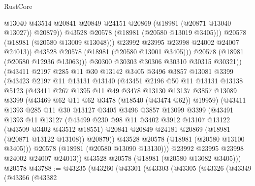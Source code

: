 \begin{lexlean}{RustCore}
\begin{coremodule}
                        @13040
                        @43514
                        @20841
                        @20849
                        @24151
                        @20869
                        (@18981 (@20871 @13040 @13027))
                        @20879))
                    @43528
                    @20578
                    (@18981 (@20580 @13019 @3405)))
                  @20578
                  (@18981 (@20580 @13009 @13048)))
                @23992
                @23995
                @23998
                @24002
                @24007
                @24013))
            @43528
            @20578
            (@18981 (@20580 @13001 @3405)))
          @20578
          (@18981 (@20580 @12936 @13063)))
        @30300
        @30303
        @30306
        @30310
        @30315
        @30321))
    (@43411
      @2197
      @285
      @11
      @30
      @13142
      @3405
      @3496
      @3857
      @13081
      @3399
      (@43423
        @2197
        @11
        @13131
        @13140
        (@43451
          @2196
          @50
          @11
          @13131
          @13138
          @5123
          (@43411
            @267
            @1395
            @11
            @49
            @3478
            @13130
            @13137
            @3857
            @13089
            @3399
            (@43469 @62 @11 @62 @3478 (@18540 (@43474 @62)) @19959)
            (@43411
              @1393
              @285
              @11
              @30
              @13127
              @3405
              @3496
              @3857
              @13099
              @3399
              (@43491
                @1393
                @11
                @13127
                (@43499
                  @230
                  @98
                  @11
                  @3402
                  @3912
                  @13107
                  @13122
                  (@43509 @3402 @43512 @18551)
                  @20841
                  @20849
                  @24181
                  @20869
                  (@18981 (@20871 @13122 @13108))
                  @20879))
              @43528
              @20578
              (@18981 (@20580 @13100 @3405)))
            @20578
            (@18981 (@20580 @13090 @13130)))
          @23992
          @23995
          @23998
          @24002
          @24007
          @24013))
      @43528
      @20578
      (@18981 (@20580 @13082 @3405)))
    @20578
@43788 := @43235
    (@43260
      (@43301
        (@43303
          (@43305
            (@43326
              (@43349
                (@43366
                  (@43382

\end{coremodule}
\end{lexlean}
